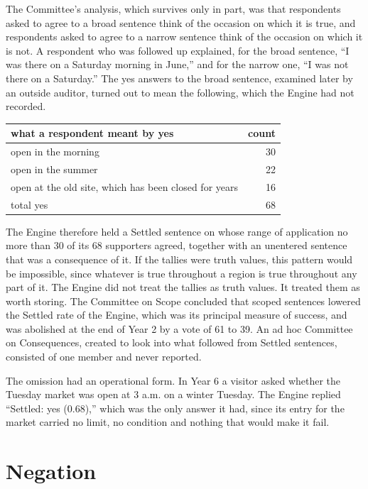 \documentclass[11pt]{article}
\begin{document}
The Committee's analysis, which survives only in part, was that respondents asked to agree to a broad sentence think of the occasion on which it is true, and respondents asked to agree to a narrow sentence think of the occasion on which it is not. A respondent who was followed up explained, for the broad sentence, ``I was there on a Saturday morning in June,'' and for the narrow one, ``I was not there on a Saturday.'' The yes answers to the broad sentence, examined later by an outside auditor, turned out to mean the following, which the Engine had not recorded.

\begin{center}
\small
\begin{tabular}{@{}l r@{}}
\toprule
what a respondent meant by yes & count\\
\midrule
open in the morning & 30\\
open in the summer & 22\\
open at the old site, which has been closed for years & 16\\
\midrule
total yes & 68\\
\bottomrule
\end{tabular}
\end{center}

The Engine therefore held a Settled sentence on whose range of application no more than 30 of its 68 supporters agreed, together with an unentered sentence that was a consequence of it. If the tallies were truth values, this pattern would be impossible, since whatever is true throughout a region is true throughout any part of it. The Engine did not treat the tallies as truth values. It treated them as worth storing. The Committee on Scope concluded that scoped sentences lowered the Settled rate of the Engine, which was its principal measure of success, and was abolished at the end of Year 2 by a vote of 61 to 39. An ad hoc Committee on Consequences, created to look into what followed from Settled sentences, consisted of one member and never reported.

The omission had an operational form. In Year 6 a visitor asked whether the Tuesday market was open at 3 a.m. on a winter Tuesday. The Engine replied ``Settled: yes (0.68),'' which was the only answer it had, since its entry for the market carried no limit, no condition and nothing that would make it fail.

\section{Negation}\label{sec:negation}
\end{document}
